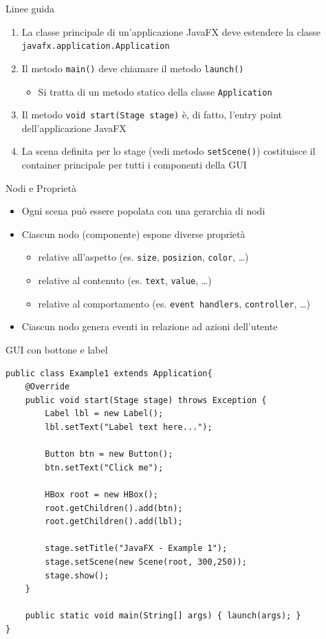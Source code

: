 \documentclass[presentation]{beamer}
\begin{document}
\begin{frame}{Linee guida}
\begin{enumerate}\itemsep20pt
\item La classe principale di un'applicazione JavaFX deve estendere la classe \texttt{javafx.application.Application}
\item Il metodo \texttt{main()} deve chiamare il metodo \texttt{launch()}
\begin{itemize}
\item Si tratta di un metodo statico della classe \texttt{Application}
\end{itemize}
\item Il metodo \texttt{void start(Stage stage)} è, di fatto, l'entry point dell'applicazione JavaFX
\item La scena definita per lo stage (vedi metodo \texttt{setScene()}) costituisce il container principale per tutti i componenti della GUI
\end{enumerate}
\end{frame}

\begin{frame}{Nodi e Proprietà}
\begin{itemize}\itemsep10pt
\item Ogni scena può essere popolata con una gerarchia di nodi
\item Ciascun nodo (componente) espone diverse proprietà
\begin{itemize}
\item relative all'aspetto (es. \texttt{size}, \texttt{posizion}, \texttt{color}, \dots)
\item relative al contenuto (es. \texttt{text}, \texttt{value}, \dots)
\item relative al comportamento (es. \texttt{event handlers}, \texttt{controller}, \dots)
\end{itemize}
\item Ciascun nodo genera eventi in relazione ad azioni dell'utente
\end{itemize}
\end{frame}

\begin{frame}[fragile]{GUI con bottone e label}
\begin{lstlisting}
public class Example1 extends Application{
	@Override
	public void start(Stage stage) throws Exception {
		Label lbl = new Label();
		lbl.setText("Label text here...");
		
		Button btn = new Button();
		btn.setText("Click me");
		
		HBox root = new HBox();
		root.getChildren().add(btn);
		root.getChildren().add(lbl);
				
		stage.setTitle("JavaFX - Example 1");
		stage.setScene(new Scene(root, 300,250));
		stage.show();
	}
	
	public static void main(String[] args) { launch(args); }
}
\end{lstlisting}
\end{frame}
\end{document}
